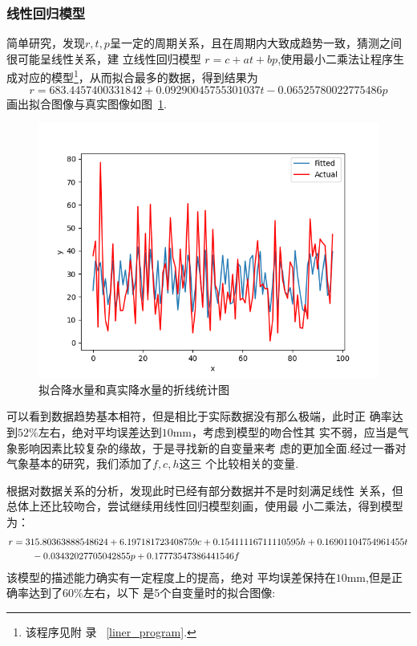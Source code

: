 \documentclass[UTF8, a4paper]{ctexart}
\begin{document}
\subsubsection{线性回归模型}

简单研究，发现$r,t,p$呈一定的周期关系，且在周期内大致成趋势一致，猜测之间很可能呈线性关系，建
立线性回归模型 $r=c+at+bp$,使用最小二乘法让程序生成对应的模型\footnote{该程序见附
	录~\textcolor{red}{ \ref{liner_program}}.}，从而拟合最多的数据，得到结果为
$$r=683.4457400331842+0.09290045755301037t-0.06525780022775486p$$画出拟合图像与真实图像如图~\textcolor{red}{\ref{pic7}}.

\begin{figure}[h!]
	\centering
	\includegraphics[scale=0.3]{fit1.png}
	\caption{拟合降水量和真实降水量的折线统计图\label{pic7}}

\end{figure}
可以看到数据趋势基本相符，但是相比于实际数据没有那么极端，此时正
确率达到$52\%$左右，绝对平均误差达到$10$\si{\milli\meter}，考虑到模型的吻合性其
实不弱，应当是气象影响因素比较复杂的缘故，于是寻找新的自变量来考
虑的更加全面.经过一番对气象基本的研究，我们添加了$f,c,h$这三
个比较相关的变量.

根据对数据关系的分析，发现此时已经有部分数据并不是时刻满足线性
关系，但总体上还比较吻合，尝试继续用线性回归模型刻画，使用最
小二乘法，得到模型为：
\begin{align}
	\notag
	r & =315.80363888548624+6.197181723408759c+0.15411116711110595h+0.16901104754961455t \\
	\notag
	  & \qquad -0.03432027705042855p+0.17773547386441546f
\end{align}
该模型的描述能力确实有一定程度上的提高，绝对
平均误差保持在$10$\si{\milli\meter},但是正确率达到了$60\%$左右，以下
是5个自变量时的拟合图像:
\end{document}
